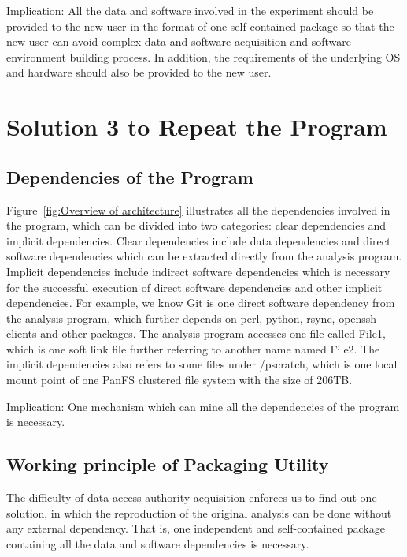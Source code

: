 \documentclass{acm_proc_article-sp}
\begin{document}
Implication: All the data and software involved in the experiment should be
provided to the new user in the format of one self-contained package so that
the new user can avoid complex data and software acquisition and software
environment building process. In addition, the requirements of the underlying
OS and hardware should also be provided to the new user.

\section{Solution 3 to Repeat the Program}
\subsection{Dependencies of the Program}

\begin{figure*}
\centering
{}
\caption{Overview of Architecture}
\label{fig:Overview of architecture}
\end{figure*}

Figure~\ref{fig:Overview of architecture} illustrates all the dependencies
involved in the program, which can be divided into two categories: clear
dependencies and implicit dependencies. Clear dependencies include data
dependencies and direct software dependencies which can be extracted directly
from the analysis program. Implicit dependencies include indirect software
dependencies which is necessary for the successful execution of direct software
dependencies and other implicit dependencies. For example, we know Git is one
direct software dependency from the analysis program, which further depends on
perl, python, rsync, openssh-clients and other packages. The analysis program
accesses one file called File1, which is one soft link file further referring to
another name named File2. 
The implicit dependencies also refers to some files under /pscratch, which is one local mount point of one PanFS clustered file system with the size of 206TB.

Implication: One mechanism which can mine all the dependencies of the program is necessary.

\subsection{Working principle of Packaging Utility} 

The difficulty of data access authority acquisition enforces us to find out one
solution, in which the reproduction of the original analysis can be done
without any external dependency. That is, one independent and self-contained
package containing all the data and software dependencies is necessary. 
\end{document}
